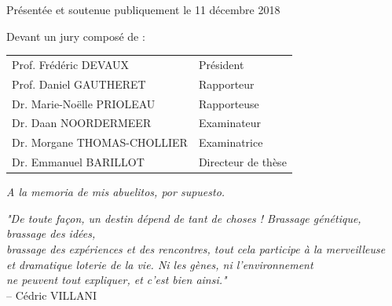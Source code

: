 \documentclass[a4paper,11pt,twoside]{book}
\begin{document}
\begin{titlepage}
\begin{center}
				Pr\'esent\'ee et soutenue publiquement le 11 d\'ecembre 2018\\[1cm]
				\begin{flushleft}
					\hspace{20.5mm}Devant un jury compos\'e de :\\
				\end{flushleft}
					\begin{center}
						\begin{tabular}{l l}
							Prof. Fr\'ed\'eric DEVAUX\hspace{25mm} & Pr\'esident\\[2mm]
							Prof. Daniel GAUTHERET & Rapporteur\\[2mm]
							Dr. Marie-No\"elle PRIOLEAU & Rapporteuse\\[2mm]
							Dr. Daan NOORDERMEER & Examinateur\\[2mm]
							Dr. Morgane THOMAS-CHOLLIER & Examinatrice\\[2mm]
							Dr. Emmanuel BARILLOT & Directeur de th\`ese\\
						\end{tabular}
					\end{center}
			\end{center}
		\endgroup
	\end{titlepage}

	\newpage
		\mbox{}

	\newpage

	\null{}
		\begin{flushright}
			\textit{A la memoria de mis abuelitos, por supuesto.}\\
		\end{flushright}
	\null

	\newpage
		\mbox{}

	\newpage

	\null{}
		\begin{flushright}
			\textit{"De toute fa\c{c}on, un destin d\'epend de tant de choses ! Brassage g\'en\'etique, brassage des id\'ees,\\ brassage des exp\'eriences et des rencontres, tout cela participe \`a la merveilleuse\\ et dramatique loterie de la vie. Ni les g\`enes, ni l'environnement\\ ne peuvent tout expliquer, et c'est bien ainsi."}\\[2mm]
			-- C\'edric VILLANI
		\end{flushright}
	\null
\end{document}
